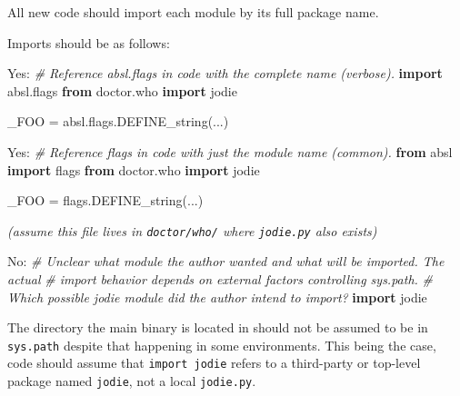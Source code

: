 \documentclass[
]{article}
\newenvironment{Shaded}{}{}
\newcommand{\CommentTok}[1]{\textcolor[rgb]{0.38,0.63,0.69}{\textit{#1}}}
\newcommand{\ImportTok}[1]{\textcolor[rgb]{0.00,0.50,0.00}{\textbf{#1}}}
\newcommand{\NormalTok}[1]{#1}
\newcommand{\OperatorTok}[1]{\textcolor[rgb]{0.40,0.40,0.40}{#1}}
\begin{document}
All new code should import each module by its full package name.

Imports should be as follows:

\begin{samepage}
\begin{Shaded}
\begin{Highlighting}[]
\NormalTok{Yes:}
  \CommentTok{\# Reference absl.flags in code with the complete name (verbose).}
  \ImportTok{import}\NormalTok{ absl.flags}
  \ImportTok{from}\NormalTok{ doctor.who }\ImportTok{import}\NormalTok{ jodie}

\NormalTok{  \_FOO }\OperatorTok{=}\NormalTok{ absl.flags.DEFINE\_string(...)}
\end{Highlighting}
\end{Shaded}
\end{samepage}

\begin{samepage}
\begin{Shaded}
\begin{Highlighting}[]
\NormalTok{Yes:}
  \CommentTok{\# Reference flags in code with just the module name (common).}
  \ImportTok{from}\NormalTok{ absl }\ImportTok{import}\NormalTok{ flags}
  \ImportTok{from}\NormalTok{ doctor.who }\ImportTok{import}\NormalTok{ jodie}

\NormalTok{  \_FOO }\OperatorTok{=}\NormalTok{ flags.DEFINE\_string(...)}
\end{Highlighting}
\end{Shaded}
\end{samepage}

\emph{(assume this file lives in \texttt{doctor/who/} where
\texttt{jodie.py} also exists)}

\begin{samepage}
\begin{Shaded}
\begin{Highlighting}[]
\NormalTok{No:}
  \CommentTok{\# Unclear what module the author wanted and what will be imported.  The actual}
  \CommentTok{\# import behavior depends on external factors controlling sys.path.}
  \CommentTok{\# Which possible jodie module did the author intend to import?}
  \ImportTok{import}\NormalTok{ jodie}
\end{Highlighting}
\end{Shaded}
\end{samepage}

The directory the main binary is located in should not be assumed to be
in \texttt{sys.path} despite that happening in some environments. This
being the case, code should assume that \texttt{import\ jodie} refers to
a third-party or top-level package named \texttt{jodie}, not a local
\texttt{jodie.py}.
\end{document}
